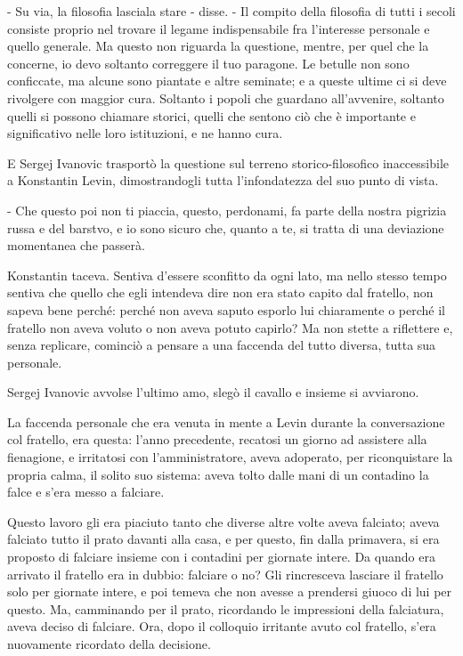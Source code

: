 - Su via, la filosofia lasciala stare - disse. - Il compito della filosofia di tutti i secoli consiste proprio nel trovare il legame indispensabile fra l'interesse personale e quello generale. Ma questo non riguarda la questione, mentre, per quel che la concerne, io devo soltanto correggere il tuo paragone. Le betulle non sono conficcate, ma alcune sono piantate e altre seminate; e a queste ultime ci si deve rivolgere con maggior cura. Soltanto i popoli che guardano all'avvenire, soltanto quelli si possono chiamare storici, quelli che sentono ciò che è importante e significativo nelle loro istituzioni, e ne hanno cura. 

E Sergej Ivanovic trasportò la questione sul terreno storico-filosofico inaccessibile a Konstantin Levin, dimostrandogli tutta l'infondatezza del suo punto di vista. 

- Che questo poi non ti piaccia, questo, perdonami, fa parte della nostra pigrizia russa e del barstvo, e io sono sicuro che, quanto a te, si tratta di una deviazione momentanea che passerà. 

Konstantin taceva. Sentiva d'essere sconfitto da ogni lato, ma nello stesso tempo sentiva che quello che egli intendeva dire non era stato capito dal fratello, non sapeva bene perché: perché non aveva saputo esporlo lui chiaramente o perché il fratello non aveva voluto o non aveva potuto capirlo? Ma non stette a riflettere e, senza replicare, cominciò a pensare a una faccenda del tutto diversa, tutta sua personale. 

Sergej Ivanovic avvolse l'ultimo amo, slegò il cavallo e insieme si avviarono. 

\label{iv-2} 

La faccenda personale che era venuta in mente a Levin durante la conversazione col fratello, era questa: l'anno precedente, recatosi un giorno ad assistere alla fienagione, e irritatosi con l'amministratore, aveva adoperato, per riconquistare la propria calma, il solito suo sistema: aveva tolto dalle mani di un contadino la falce e s'era messo a falciare. 

Questo lavoro gli era piaciuto tanto che diverse altre volte aveva falciato; aveva falciato tutto il prato davanti alla casa, e per questo, fin dalla primavera, si era proposto di falciare insieme con i contadini per giornate intere. Da quando era arrivato il fratello era in dubbio: falciare o no? Gli rincresceva lasciare il fratello solo per giornate intere, e poi temeva che non avesse a prendersi giuoco di lui per questo. Ma, camminando per il prato, ricordando le impressioni della falciatura, aveva deciso di falciare. Ora, dopo il colloquio irritante avuto col fratello, s'era nuovamente ricordato della decisione. 

